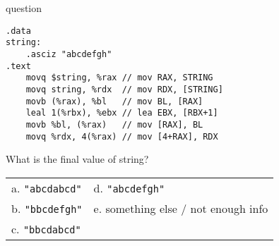 \begin{frame}[fragile,label=question]{question}
\lstset{style=small,language=myasm,deletekeywords=bl}
\begin{lstlisting}
.data
string:
    .asciz "abcdefgh"
.text
    movq $string, %rax // mov RAX, STRING
    movq string, %rdx  // mov RDX, [STRING]
    movb (%rax), %bl   // mov BL, [RAX]
    leal 1(%rbx), %ebx // lea EBX, [RBX+1]
    movb %bl, (%rax)   // mov [RAX], BL
    movq %rdx, 4(%rax) // mov [4+RAX], RDX
\end{lstlisting}
{\small What is the final value of string?}
\begin{tabular}{ll}
a. \texttt{"abcdabcd"} & d. \texttt{"abcdefgh"} \\
b. \texttt{"bbcdefgh"} & e. something else / not enough info \\
c. \texttt{"bbcdabcd"} & ~ \\
\end{tabular}
\end{frame}

